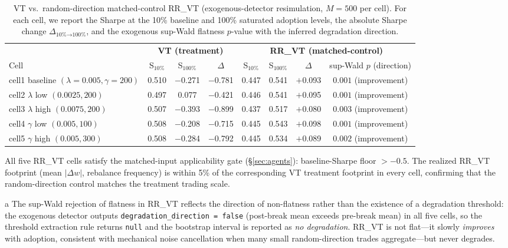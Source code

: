 \documentclass[12pt,a4paper]{article}
\begin{document}
\begin{table}[H]
\centering
\begin{threeparttable}
\caption{VT vs.\ random-direction matched-control RR\_VT (exogenous-detector resimulation, $M = 500$ per cell). For each cell, we report the Sharpe at the 10\% baseline and 100\% saturated adoption levels, the absolute Sharpe change $\Delta_{\text{10\%} \to \text{100\%}}$, and the exogenous sup-Wald flatness $p$-value with the inferred degradation direction.}
\label{tab:matched_control_vt}
\footnotesize
\setlength{\tabcolsep}{4pt}
\begin{tabular}{@{}lccccccc@{}}
\toprule
 & \multicolumn{3}{c}{\textbf{VT (treatment)}} & \multicolumn{4}{c}{\textbf{RR\_VT (matched-control)}} \\
\cmidrule(lr){2-4} \cmidrule(lr){5-8}
Cell & S$_{10\%}$ & S$_{100\%}$ & $\Delta$ & S$_{10\%}$ & S$_{100\%}$ & $\Delta$ & sup-Wald $p$ (direction)\tnote{a} \\
\midrule
cell1 baseline $(\lambda{=}0.005,\gamma{=}200)$ & 0.510 & $-$0.271 & $-$0.781 & 0.447 & 0.541 & $+$0.093 & $0.001$ (improvement) \\
cell2 $\lambda$ low $(0.0025, 200)$            & 0.497 & 0.077    & $-$0.421 & 0.446 & 0.541 & $+$0.095 & $0.001$ (improvement) \\
cell3 $\lambda$ high $(0.0075, 200)$           & 0.507 & $-$0.393 & $-$0.899 & 0.437 & 0.517 & $+$0.080 & $0.003$ (improvement) \\
cell4 $\gamma$ low $(0.005, 100)$              & 0.508 & $-$0.208 & $-$0.715 & 0.445 & 0.543 & $+$0.098 & $0.001$ (improvement) \\
cell5 $\gamma$ high $(0.005, 300)$             & 0.508 & $-$0.284 & $-$0.792 & 0.445 & 0.534 & $+$0.089 & $0.002$ (improvement) \\
\bottomrule
\end{tabular}
\begin{tablenotes}
\footnotesize
\item All five RR\_VT cells satisfy the matched-input applicability gate (\S\ref{sec:agents}): baseline-Sharpe floor $> -0.5$. The realized RR\_VT footprint (mean $|\Delta w|$, rebalance frequency) is within 5\% of the corresponding VT treatment footprint in every cell, confirming that the random-direction control matches the treatment trading scale.
\item[a] The sup-Wald rejection of flatness in RR\_VT reflects the direction of non-flatness rather than the existence of a degradation threshold: the exogenous detector outputs \texttt{degradation\_direction = false} (post-break mean exceeds pre-break mean) in all five cells, so the threshold extraction rule returns \texttt{null} and the bootstrap interval is reported as \emph{no degradation}. RR\_VT is not flat---it slowly \emph{improves} with adoption, consistent with mechanical noise cancellation when many small random-direction trades aggregate---but never degrades.
\end{tablenotes}
\end{threeparttable}
\end{table}
\end{document}
